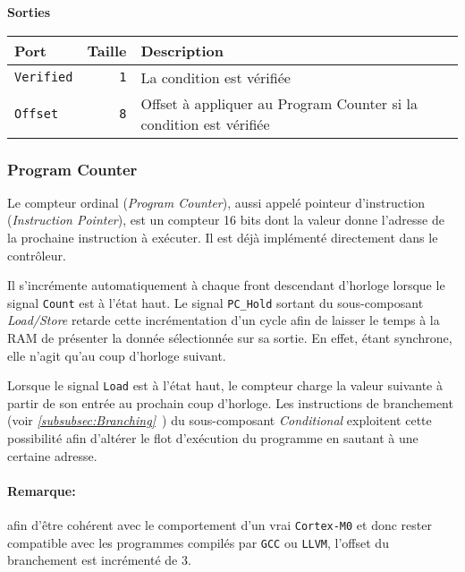 \documentclass{article}
\begin{document}
    \vspace{1em}
    \textbf{Sorties}\\

    \begin{tabular}{|l|r|l|}
        \hline
        \textbf{Port}     & \textbf{Taille} & \textbf{Description}                                               \\

        \hline
        \texttt{Verified} & \texttt{1}      & La condition est vérifiée                                          \\
        \hline
        \texttt{Offset}   & \texttt{8}      & Offset à appliquer au Program Counter si la condition est vérifiée \\

        \hline
    \end{tabular}

    \subsubsection{Program Counter}


    Le compteur ordinal (\textit{Program Counter}), aussi appelé pointeur d'instruction (\textit{Instruction Pointer}),
    est un compteur 16 bits dont la valeur donne l'adresse de la prochaine instruction à exécuter.
    Il est déjà implémenté directement dans le contrôleur.

    Il s'incrémente automatiquement à chaque front descendant d'horloge lorsque le signal \texttt{Count} est à l'état haut.
    Le signal \texttt{PC\_Hold} sortant du sous-composant \textit{Load/Store} retarde cette incrémentation d'un cycle afin de laisser le temps à la RAM de présenter la donnée sélectionnée sur sa sortie.
    En effet, étant synchrone, elle n'agit qu'au coup d'horloge suivant.

    Lorsque le signal \texttt{Load} est à l'état haut, le compteur charge la valeur suivante à partir de son entrée au prochain coup d'horloge.
    Les instructions de branchement (voir \textit{\ref{subsubsec:Branching}~}) du sous-composant \textit{Conditional} exploitent cette possibilité
    afin d'altérer le flot d'exécution du programme en sautant à une certaine adresse.

    \paragraph{Remarque:} afin d'être cohérent avec le comportement d'un vrai \texttt{Cortex-M0} et donc rester compatible avec les programmes compilés par \texttt{GCC} ou \texttt{LLVM},
    l'offset du branchement est incrémenté de 3.
\end{document}
